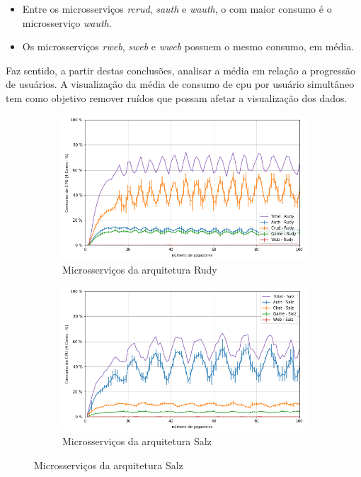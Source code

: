 \begin{itemize}
 \item Entre os microsserviços \textit{rcrud}, \textit{sauth} e \textit{wauth}, o com maior consumo é o microsserviço \textit{wauth}.
 \item Os microsserviços \textit{rweb}, \textit{sweb} e \textit{wweb} possuem o mesmo consumo, em média.
\end{itemize}

Faz sentido, a partir destas conclusões, analisar a média em relação a progressão de usuários.
%
A visualização da média de consumo de \ac{cpu} por usuário simultâneo tem como objetivo remover ruídos que possam afetar a visualização dos dados.

\begin{figure}[htb!]
    \caption{Média do consumo de \ac{cpu} dos microsserviços por jogador simultâneo}
    \label{fig:cpu_game_media_por_jogador}

    \begin{subfigure}{0.5\textwidth}
        \centering
        \includegraphics[width=.95\linewidth]{figuras/analise/cpu_r_arch_media_por_jogador.png}
        \caption{Microsserviços da arquitetura Rudy}
        \label{fig:cpu_r_arch_media_por_jogador}
    \end{subfigure}%
    \begin{subfigure}{0.5\textwidth}
        \centering
        \includegraphics[width=.95\linewidth]{figuras/analise/cpu_s_arch_media_por_jogador.png}
        \caption{Microsserviços da arquitetura Salz}
        \label{fig:cpu_s_arch_media_por_jogador}
    \end{subfigure}


\end{figure}
